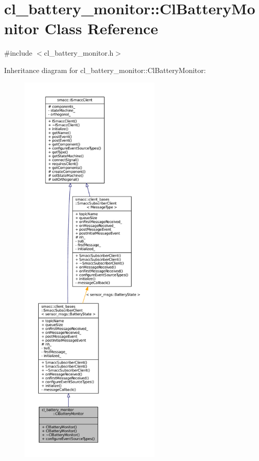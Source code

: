 \hypertarget{classcl__battery__monitor_1_1ClBatteryMonitor}{}\section{cl\+\_\+battery\+\_\+monitor\+:\+:Cl\+Battery\+Monitor Class Reference}
\label{classcl__battery__monitor_1_1ClBatteryMonitor}


{\ttfamily \#include $<$cl\+\_\+battery\+\_\+monitor.\+h$>$}



Inheritance diagram for cl\+\_\+battery\+\_\+monitor\+:\+:Cl\+Battery\+Monitor\+:
\nopagebreak
\begin{figure}[H]
\begin{center}
\leavevmode
\includegraphics[height=550pt]{classcl__battery__monitor_1_1ClBatteryMonitor__inherit__graph}
\end{center}
\end{figure}


